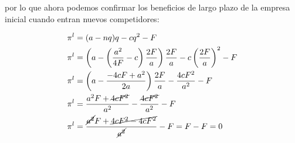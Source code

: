 \documentclass[11pt]{article}
\begin{document}
\begin{flushleft}
\begin{example}
        por lo que ahora podemos confirmar los beneficios de largo plazo de la empresa inicial cuando entran nuevos competidores:

        \begin{align*}
            \pi^l &= (a-nq)q-cq^2-F\\
            \pi^l &= \left(a-\left(\frac{a^2}{4F}-c\right)\frac{2F}{a}\right)\frac{2F}{a}-c\left(\frac{2F}{a}\right)^2-F\\
            \pi^l &= \left(a-\frac{-4cF+a^{2}}{2a}\right)\frac{2F}{a}-\frac{4cF^{2}}{a^{2}}-F\\
            \pi^l &= \frac{a^{2}F+\cancel{4cF^2}}{a^{2}}-\frac{\cancel{4cF^{2}}}{a^{2}}-F\\
            \pi^l &= \frac{\cancel{a^{2}}F+\cancel{4cF^2-4cF^{2}}}{\cancel{a^{2}}}-F=F-F=0
        \end{align*}
    \end{example}
\end{flushleft}

\newpage
\medskip

\nocite{*}
 

\newpage
\end{document}
